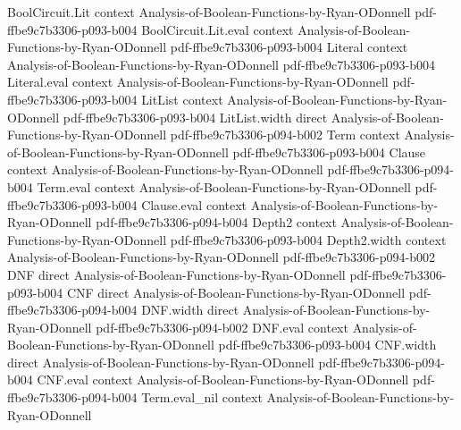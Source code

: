 \begin{theorem}
\leanok
{}
\proofstep
  {BoolCircuit.Lit}
  {context}
  {Analysis-of-Boolean-Functions-by-Ryan-ODonnell}
  {pdf-ffbe9c7b3306-p093-b004}
\proofstep
  {BoolCircuit.Lit.eval}
  {context}
  {Analysis-of-Boolean-Functions-by-Ryan-ODonnell}
  {pdf-ffbe9c7b3306-p093-b004}
\proofstep
  {Literal}
  {context}
  {Analysis-of-Boolean-Functions-by-Ryan-ODonnell}
  {pdf-ffbe9c7b3306-p093-b004}
\proofstep
  {Literal.eval}
  {context}
  {Analysis-of-Boolean-Functions-by-Ryan-ODonnell}
  {pdf-ffbe9c7b3306-p093-b004}
\proofstep
  {LitList}
  {context}
  {Analysis-of-Boolean-Functions-by-Ryan-ODonnell}
  {pdf-ffbe9c7b3306-p093-b004}
\proofstep
  {LitList.width}
  {direct}
  {Analysis-of-Boolean-Functions-by-Ryan-ODonnell}
  {pdf-ffbe9c7b3306-p094-b002}
\proofstep
  {Term}
  {context}
  {Analysis-of-Boolean-Functions-by-Ryan-ODonnell}
  {pdf-ffbe9c7b3306-p093-b004}
\proofstep
  {Clause}
  {context}
  {Analysis-of-Boolean-Functions-by-Ryan-ODonnell}
  {pdf-ffbe9c7b3306-p094-b004}
\proofstep
  {Term.eval}
  {context}
  {Analysis-of-Boolean-Functions-by-Ryan-ODonnell}
  {pdf-ffbe9c7b3306-p093-b004}
\proofstep
  {Clause.eval}
  {context}
  {Analysis-of-Boolean-Functions-by-Ryan-ODonnell}
  {pdf-ffbe9c7b3306-p094-b004}
\proofstep
  {Depth2}
  {context}
  {Analysis-of-Boolean-Functions-by-Ryan-ODonnell}
  {pdf-ffbe9c7b3306-p093-b004}
\proofstep
  {Depth2.width}
  {context}
  {Analysis-of-Boolean-Functions-by-Ryan-ODonnell}
  {pdf-ffbe9c7b3306-p094-b002}
\proofstep
  {DNF}
  {direct}
  {Analysis-of-Boolean-Functions-by-Ryan-ODonnell}
  {pdf-ffbe9c7b3306-p093-b004}
\proofstep
  {CNF}
  {direct}
  {Analysis-of-Boolean-Functions-by-Ryan-ODonnell}
  {pdf-ffbe9c7b3306-p094-b004}
\proofstep
  {DNF.width}
  {direct}
  {Analysis-of-Boolean-Functions-by-Ryan-ODonnell}
  {pdf-ffbe9c7b3306-p094-b002}
\proofstep
  {DNF.eval}
  {context}
  {Analysis-of-Boolean-Functions-by-Ryan-ODonnell}
  {pdf-ffbe9c7b3306-p093-b004}
\proofstep
  {CNF.width}
  {direct}
  {Analysis-of-Boolean-Functions-by-Ryan-ODonnell}
  {pdf-ffbe9c7b3306-p094-b004}
\proofstep
  {CNF.eval}
  {context}
  {Analysis-of-Boolean-Functions-by-Ryan-ODonnell}
  {pdf-ffbe9c7b3306-p094-b004}
\proofstep
  {Term.eval_nil}
  {context}
  {Analysis-of-Boolean-Functions-by-Ryan-ODonnell}

\end{theorem}
